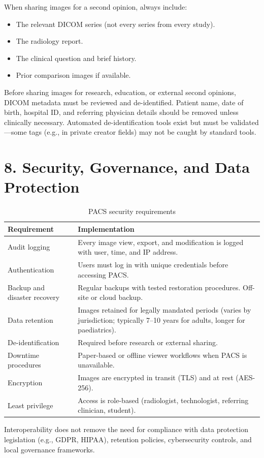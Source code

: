 When sharing images for a second opinion, always include:
\begin{itemize}
    \item The relevant DICOM series (not every series from every study).
    \item The radiology report.
    \item The clinical question and brief history.
    \item Prior comparison images if available.
\end{itemize}

\begin{pearlbox}
Before sharing images for research, education, or external second opinions, DICOM metadata must be reviewed and de-identified. Patient name, date of birth, hospital ID, and referring physician details should be removed unless clinically necessary. Automated de-identification tools exist but must be validated---some tags (e.g., in private creator fields) may not be caught by standard tools.
\end{pearlbox}


\section*{8. Security, Governance, and Data Protection}

\begin{table}[h]
\centering
\caption{PACS security requirements}
\begin{tabular}{|l|p{8cm}|}
\hline
\textbf{Requirement} & \textbf{Implementation} \\
\hline
Audit logging & Every image view, export, and modification is logged with user, time, and IP address. \\
\hline
Authentication & Users must log in with unique credentials before accessing PACS. \\
\hline
Backup and disaster recovery & Regular backups with tested restoration procedures. Off-site or cloud backup. \\
\hline
Data retention & Images retained for legally mandated periods (varies by jurisdiction; typically 7--10 years for adults, longer for paediatrics). \\
\hline
De-identification & Required before research or external sharing. \\
\hline
Downtime procedures & Paper-based or offline viewer workflows when PACS is unavailable. \\
\hline
Encryption & Images are encrypted in transit (TLS) and at rest (AES-256). \\
\hline
Least privilege & Access is role-based (radiologist, technologist, referring clinician, student). \\
\hline
\end{tabular}
\end{table}

Interoperability does not remove the need for compliance with data protection legislation (e.g., GDPR, HIPAA), retention policies, cybersecurity controls, and local governance frameworks.

\clearpage
